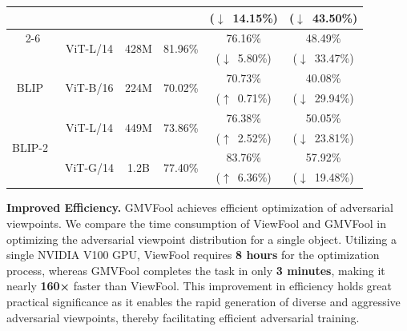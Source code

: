 \documentclass[10pt,journal,compsoc]{IEEEtran}
\begin{document}
\begin{table}[htb]
\begin{tabular}{c|c|c|c|c|c}
                        &                                                         &                                                           &                         & ($\downarrow$~14.15\%) & ($\downarrow$~43.50\%)    \\ \cline{2-6} 
                        & \multirow{2}{*}{ViT-L/14}                               & \multirow{2}{*}{428M}                                   & \multirow{2}{*}{81.96\%} & 76.16\%   & 48.49\%      \\
                        &                                                         &                                                           &                         & ($\downarrow$~5.80\%)  & ($\downarrow$~33.47\%)    \\ \hline
\multirow{2}{*}{\scriptsize BLIP~\cite{li2022blip}}   & \multirow{2}{*}{ViT-B/16}                               & \multirow{2}{*}{224M}                                   & \multirow{2}{*}{70.02\%} & 70.73\%   & 40.08\%      \\
                        &                                                         &                                                           &                         & ($\uparrow$~0.71\%)  & ($\downarrow$~29.94\%)    \\ \hline
\multirow{4}{*}{\scriptsize BLIP-2~\cite{li2023blip}} & \multirow{2}{*}{ViT-L/14}                               & \multirow{2}{*}{449M}                                   & \multirow{2}{*}{73.86\%} & 76.38\%   & 50.05\%      \\
                        &                                                         &                                                           &                         & ($\uparrow$~2.52\%)  & ($\downarrow$~23.81\%)    \\ \cline{2-6} 
                        & \multirow{2}{*}{ViT-G/14}                               & \multirow{2}{*}{1.2B}                                    & \multirow{2}{*}{77.40\%} & 83.76\%   & 57.92\%      \\
                        &                                                         &                                                           &                         & ($\uparrow$~6.36\%)  & ($\downarrow$~19.48\%)    \\ \hline
\end{tabular}
\label{table:vlp}
\end{table}


\noindent \textbf{Improved Efficiency.} GMVFool achieves efficient optimization of adversarial viewpoints. We compare the time consumption of ViewFool and GMVFool in optimizing the adversarial viewpoint distribution for a single object. Utilizing a single NVIDIA V100 GPU, ViewFool requires \textbf{8 hours} for the optimization process, whereas GMVFool completes the task in only \textbf{3 minutes}, making it nearly \textbf{160×} faster than ViewFool. This improvement in efficiency holds great practical significance as it enables the rapid generation of diverse and aggressive adversarial viewpoints, thereby facilitating efficient adversarial training.
\end{document}
